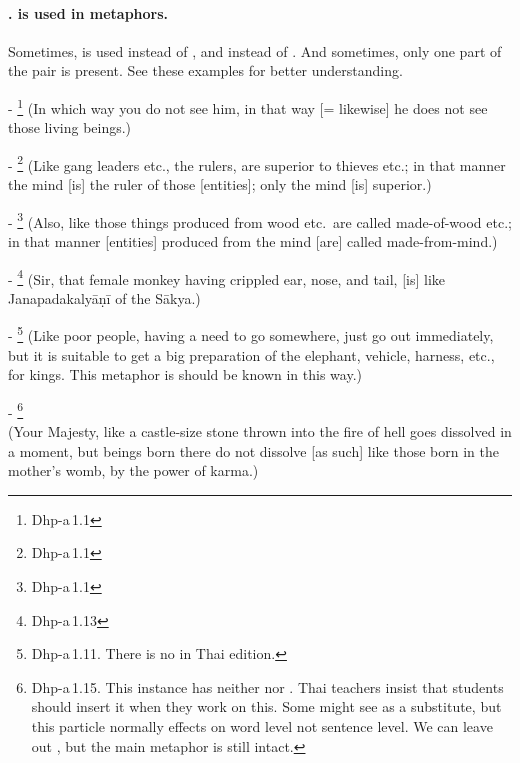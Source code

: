 \paragraph*{.  is used in metaphors.} Sometimes,  is used instead of , and  instead of . And sometimes, only one part of the pair is present. See these examples for better understanding.\par
- \footnote{Dhp-a\,1.1} (In which way you do not see him, in that way [= likewise] he does not see those living beings.)\par
- \footnote{Dhp-a\,1.1} (Like gang leaders etc., the rulers, are superior to thieves etc.; in that manner the mind [is] the ruler of those [entities]; only the mind [is] superior.)\par
- \footnote{Dhp-a\,1.1} (Also, like those things produced from wood etc.\ are called made-of-wood etc.; in that manner [entities] produced from the mind [are] called made-from-mind.)\par
- \footnote{Dhp-a\,1.13} (Sir, that female monkey having crippled ear, nose, and tail, [is] like Janapadakaly\=a\d n\=i of the S\=akya.)\par
- \footnote{Dhp-a\,1.11. There is no  in Thai edition.} (Like poor people, having a need to go somewhere, just go out immediately, but it is suitable to get a big preparation of the elephant, vehicle, harness, etc., for kings. This metaphor is should be known in this way.)\par
- \footnote{Dhp-a\,1.15. This instance has neither  nor . Thai teachers insist that students should insert it when they work on this. Some might see  as a substitute, but this particle normally effects on word level not sentence level. We can leave out , but the main metaphor is still intact.} \\(Your Majesty, like a castle-size stone thrown into the fire of hell goes dissolved in a moment, but beings born there do not dissolve [as such] like those born in the mother's womb, by the power of karma.)\par

